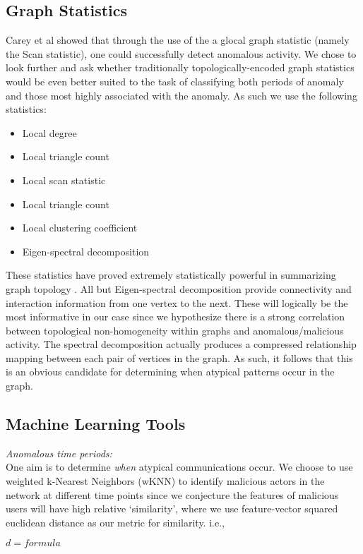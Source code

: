 \documentclass[11pt,letterpaper]{article}
\begin{document}
\subsection{Graph Statistics}
Carey et al \cite{priebe2005scan} showed that through the use of the a glocal graph 
statistic (namely the Scan statistic), one could successfully detect anomalous activity.
We chose to look further and ask whether traditionally topologically-encoded graph statistics would
be even better suited to the task of classifying both periods of anomaly and those
most highly associated with the anomaly. As such we use the following statistics:
\begin{itemize}
\item Local degree 
\item Local triangle count
\item Local scan statistic
\item Local triangle count
\item Local clustering coefficient
\item Eigen-spectral decomposition
\end{itemize}
These statistics have proved extremely statistically powerful in summarizing graph
topology \cite{pao2011statistical}. All but Eigen-spectral decomposition provide
connectivity and interaction information from one vertex to the next. These will
logically be the most informative in our case since we hypothesize there is a strong
correlation between topological non-homogeneity within graphs and anomalous/malicious
activity. The spectral decomposition actually produces a compressed relationship mapping
between each pair of vertices in the graph. As such, it follows that this is an obvious
candidate for determining when atypical patterns occur in the graph.

\subsection{Machine Learning Tools}
\hspace*{10pt}\textit{Anomalous time periods:} \\
One aim is to determine \textit{when} atypical communications occur. We choose to
use weighted k-Nearest Neighbors (wKNN) to identify malicious actors in the network
at different time points since we conjecture the features of malicious users will
have high relative `similarity', where we use feature-vector squared euclidean distance
as our metric for similarity. i.e.,

$d = formula$
\end{document}
